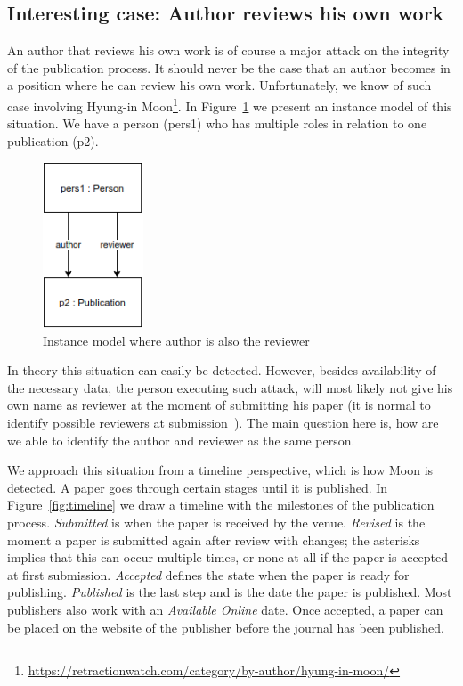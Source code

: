 \documentclass{ou-report}
\begin{document}
\subsection{Interesting case: Author reviews his own work}
\label{interesting_case:author_reviews_own_work}
An author that reviews his own work is of course a major attack on the
integrity of the publication process. It should never be the case that an author
becomes in a position where he can review his own work. Unfortunately, we know
of such case involving Hyung-in
Moon\footnote{\url{https://retractionwatch.com/category/by-author/hyung-in-moon/}}. 
In Figure~\ref{fig:air} we present an instance model of this situation. We have 
a person (pers1) who has multiple roles in relation to one publication (p2).

\begin{figure}[H]
\centering
\includegraphics[width=3cm]{images/author_is_reviewer.drawio.png}
\caption{Instance model where author is also the reviewer}
\label{fig:air}
\end{figure}
In theory this situation can easily be detected. However, besides 
availability of the necessary data, the person executing such attack, will 
most likely not give his own name as reviewer at the moment of submitting his 
paper (it is 
normal to identify possible reviewers at submission~\cite{C2013}). The main
question here 
is, how are we able to identify the author and reviewer as the same person.

We approach this situation from a timeline perspective, which is how Moon is 
detected. A paper goes through certain stages until it is published. In
Figure~\ref{fig:timeline} we draw a timeline with the milestones of the
publication process. \textit{Submitted} is when the paper is received by the
venue. \textit{Revised} is the moment a paper is submitted again after review
with changes; the asterisks implies that this can occur multiple times, or none
at all if the paper is accepted at first submission. \textit{Accepted} defines
the state when the paper is ready for publishing. \textit{Published} is the last
step and is the date the paper is published.
Most publishers also work with an \textit{Available Online} date. Once accepted,
a paper can be placed on the website of the publisher before the journal has
been published.
\end{document}
